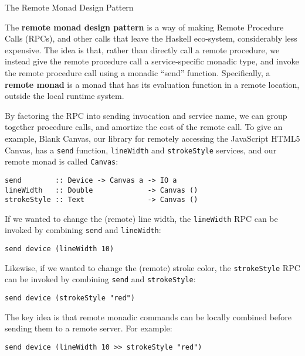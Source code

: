 \begin{hcarentry}{The Remote Monad Design Pattern}
\label{RemoteMonad}
\makeheader

The {\bf remote monad design pattern} is a way of
making Remote Procedure Calls (RPCs), and other
calls that leave the Haskell eco-system, considerably less expensive.
The idea is that, rather than directly call a remote procedure,
we instead give the remote procedure call a service-specific monadic
type, and invoke the remote procedure call using a monadic ``send'' function.
Specifically, a {\bf remote monad} is a monad that has its evaluation function in
a remote location, outside the local runtime system.

By factoring the RPC into sending invocation and service name, we can
group together procedure calls, and amortize the cost of the remote
call. To give an example, Blank Canvas, our library for remotely
accessing the JavaScript HTML5 Canvas, has a \verb|send| function,
\verb`lineWidth` and \verb`strokeStyle` services, and our remote monad is called
\verb`Canvas`:

\begin{verbatim}
send        :: Device -> Canvas a -> IO a
lineWidth   :: Double             -> Canvas ()
strokeStyle :: Text               -> Canvas ()
\end{verbatim}

If we wanted to change the (remote) line width,
the \verb`lineWidth` RPC can be invoked by combining \verb`send`
and \verb`lineWidth`:

\begin{verbatim}
send device (lineWidth 10)
\end{verbatim}

Likewise, if we wanted to change the (remote) stroke color,
the \verb`strokeStyle` RPC can be invoked by combining \verb`send`
and \verb`strokeStyle`:

\begin{verbatim}
send device (strokeStyle "red")
\end{verbatim}

The key idea is that remote monadic commands can
be locally combined before sending them to a remote server.
For example:

\begin{verbatim}
send device (lineWidth 10 >> strokeStyle "red")
\end{verbatim}


\end{hcarentry}
